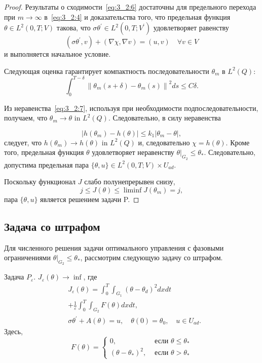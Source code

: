 \begin{proof}
    Результаты о сходимости~\eqref{eq:3_2:6} достаточны для предельного перехода
    при $m \rightarrow \infty$ в~\eqref{eq:3_2:4} и доказательства того,
    что предельная функция $\theta \in L^{2}(0, T ; V) $ такова,
    что $\sigma \theta^{\prime} \in L^{2}\left(0, T ; V^{\prime}\right)$
    удовлетворяет равенству
    \[ \left(\sigma \theta^{\prime}, v\right)+(\nabla \chi, \nabla v)=(u, v) \quad \forall v \in V \]
    и выполняется начальное условие.

    Следующая оценка гарантирует компактность последовательности $\theta_{m}$ в $L^{2}(Q)$:
    \begin{equation}
        \label{eq:3_2:7}
        \int_{0}^{T-\delta}\left\|\theta_{m}(s+\delta)-\theta_{m}(s)\right\|^{2} d s \leq C \delta.
    \end{equation}

    Из неравенства~\eqref{eq:3_2:7}, используя при необходимости подпоследовательности,
    получаем, что $\theta_{m} \rightarrow \theta$ in $L^{2}(Q)$.
    Следовательно, в силу неравенства

    \[
        \left|h\left(\theta_{m}\right)-h(\theta)\right|
        \leq k_{1}\left|\theta_{m}-\theta\right|,
    \]
    следует, что $h\left(\theta_{m}\right) \rightarrow h(\theta)$ in $L^{2}(Q)$
    и, следовательно $\chi=h(\theta)$.
    Кроме того, предельная функция $\theta$ удовлетворяет неравенству
    $\left.\theta\right|_{G_{2}} \leq \theta_{*}.$
    Следовательно, допустима предельная пара
    $\{\theta, u\} \in L^{2}(0, T ; V) \times U_{a d}.$


    Поскольку функционал $J$ слабо полунепрерывен снизу,
    \[ j \leq J(\theta) \leq \liminf J\left(\theta_{m}\right)=j, \]
    пара $\{\theta, u\}$ является решением задачи P\@.
\end{proof}

\subsection{Задача со штрафом}
\label{subsec:ch3/sec2/penalty}
Для численного решения задачи оптимального управления с фазовыми ограничениями
$\left.\theta\right|_{G_{2}} \leq \theta_{*}$, рассмотрим следующую задачу со штрафом.

Задача $P_{\varepsilon}$.
$J_{\varepsilon}(\theta) \rightarrow \inf$, где
\[
    \begin{aligned}
        & J_{\varepsilon}(\theta)=\int_{0}^{T}
        \int_{G_{1}}\left(\theta-\theta_{d}\right)^{2} d x d t \\
        & +\frac{1}{\varepsilon} \int_{0}^{T}
        \int_{G_{2}} F(\theta) d x d t, \\
        & \sigma \theta^{\prime}+A(\theta)=u,
        \quad \theta(0)=\theta_{0}, \quad u \in U_{a d}.
    \end{aligned}
\]
Здесь,
\[
    F(\theta)=
    \begin{cases}
        0, & \text { если } \theta \leq \theta_{*} \\
        \left(\theta-\theta_{*}\right)^{2},
        & \text { если } \theta>\theta_{*}
    \end{cases}
\]

